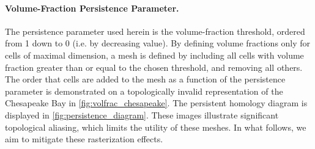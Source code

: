 
\paragraph{Volume-Fraction Persistence Parameter.}
The persistence parameter used herein is the volume-fraction threshold, ordered from 1 down to 0 (i.e. by decreasing value).
By defining volume fractions only for cells of maximal dimension, a mesh is defined by including all cells with volume fraction greater than or equal to the chosen threshold, and removing all others.
The order that cells are added to the mesh as a function of the persistence parameter is demonstrated on a topologically invalid representation of the Chesapeake Bay in \cref{fig:volfrac_chesapeake}.
The persistent homology diagram is displayed in \cref{fig:persistence_diagram}.
These images illustrate significant topological aliasing, which limits the utility of these meshes.
In what follows, we aim to mitigate these rasterization effects.


